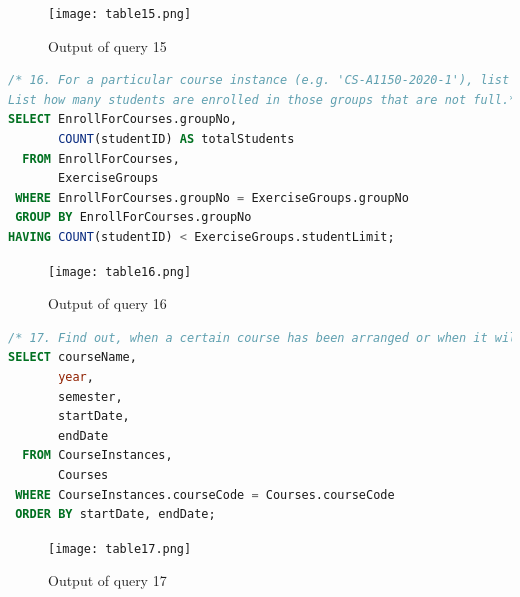 \documentclass{article}
\begin{document}
\begin{figure}[!h]
	\centering
	\texttt{[image: table15.png]}
	\caption{Output of query 15}
	\label{fig:15}
\end{figure}

\begin{lstlisting}[language=SQL]
/* 16. For a particular course instance (e.g. 'CS-A1150-2020-1'), list the exercise groups that are not full yet. 
List how many students are enrolled in those groups that are not full.*/
SELECT EnrollForCourses.groupNo,
       COUNT(studentID) AS totalStudents
  FROM EnrollForCourses,
       ExerciseGroups
 WHERE EnrollForCourses.groupNo = ExerciseGroups.groupNo
 GROUP BY EnrollForCourses.groupNo
HAVING COUNT(studentID) < ExerciseGroups.studentLimit;
\end{lstlisting}

\begin{figure}[!h]
	\centering
	\texttt{[image: table16.png]}
	\caption{Output of query 16}
	\label{fig:16}
\end{figure}

\begin{lstlisting}[language=SQL]
/* 17. Find out, when a certain course has been arranged or when it will be arranged */
SELECT courseName,
       year,
       semester,
       startDate,
       endDate
  FROM CourseInstances,
       Courses
 WHERE CourseInstances.courseCode = Courses.courseCode
 ORDER BY startDate, endDate;
 \end{lstlisting}
 
 \begin{figure}[!h]
 	\centering
 	\texttt{[image: table17.png]}
 	\caption{Output of query 17}
 	\label{fig:17}
 \end{figure}
 
\end{document}
